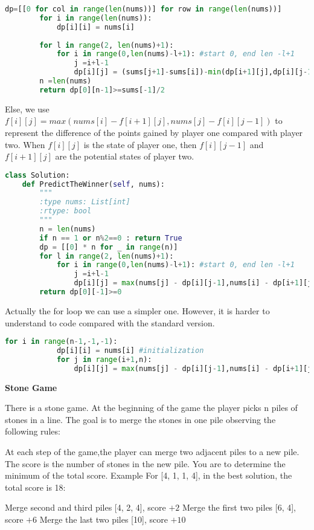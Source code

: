 \documentclass[../main.tex]{subfiles}
\begin{document}
\begin{examples}[resume]
\begin{lstlisting}[language = Python]
        dp=[[0 for col in range(len(nums))] for row in range(len(nums))]
        for i in range(len(nums)):
            dp[i][i] = nums[i]
        
        for l in range(2, len(nums)+1):
            for i in range(0,len(nums)-l+1): #start 0, end len -l+1
                j =i+l-1
                dp[i][j] = (sums[j+1]-sums[i])-min(dp[i+1][j],dp[i][j-1])
        n =len(nums)
        return dp[0][n-1]>=sums[-1]/2
\end{lstlisting}
Else, we use $f[i][j] = max(nums[i]-f[i+1][j], nums[j]-f[i][j-1])$ to represent the difference of the points gained by player one compared with player two. When $f[i][j]$ is the state of player one, then $f[i][j-1]$ and $f[i+1][j]$ are the potential states of player two. 
\begin{lstlisting}[language = Python]
class Solution:
    def PredictTheWinner(self, nums):
        """
        :type nums: List[int]
        :rtype: bool
        """
        n = len(nums)
        if n == 1 or n%2==0 : return True
        dp = [[0] * n for _ in range(n)]
        for l in range(2, len(nums)+1):
            for i in range(0,len(nums)-l+1): #start 0, end len -l+1
                j =i+l-1
                dp[i][j] = max(nums[j] - dp[i][j-1],nums[i] - dp[i+1][j])
        return dp[0][-1]>=0
\end{lstlisting}
Actually the for loop we can use a simpler one. However, it is harder to understand to code compared with the standard version.
\begin{lstlisting}[language = Python]
for i in range(n-1,-1,-1):
            dp[i][i] = nums[i] #initialization
            for j in range(i+1,n):
                dp[i][j] = max(nums[j] - dp[i][j-1],nums[i] - dp[i+1][j])
\end{lstlisting}


\item \textbf{Stone Game}

There is a stone game. At the beginning of the game the player picks n piles of stones in a line. The goal is to merge the stones in one pile observing the following rules:

 At each step of the game,the player can merge two adjacent piles to a new pile. The score is the number of stones in the new pile. You are to determine the minimum of the total score.
 Example
 For [4, 1, 1, 4], in the best solution, the total score is 18:

    Merge second and third piles [4, 2, 4], score $+2$
    Merge the first two piles [6, 4], score $+6$
    Merge the last two piles [10], score $+10$


\end{examples}
\end{document}
